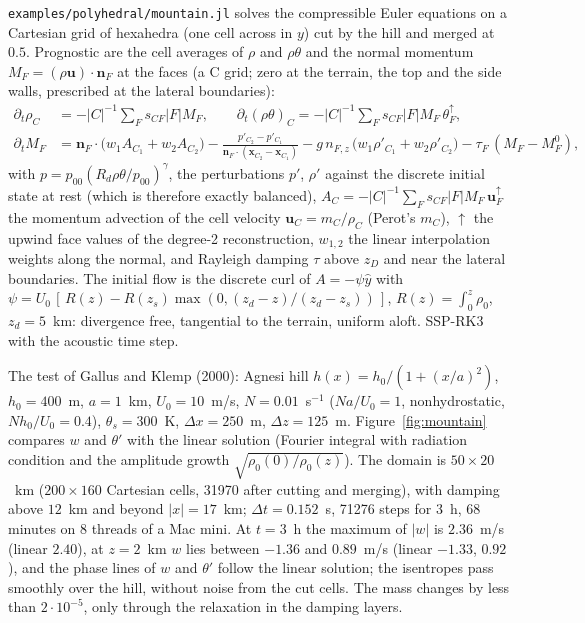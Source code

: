 \documentclass[11pt,a4paper]{article}
\newcommand{\code}[1]{\texttt{#1}}
\newcommand{\bn}{\mathbf{n}}
\newcommand{\bx}{\mathbf{x}}
\newcommand{\bu}{\mathbf{u}}
\begin{document}
\code{examples/polyhedral/mountain.jl} solves the compressible Euler equations on a Cartesian grid of
hexahedra (one cell across in $y$) cut by the hill and merged at $0.5$. Prognostic are the cell
averages of $\rho$ and $\rho\theta$ and the normal momentum $M_F = (\rho\bu)\cdot\bn_F$ at the faces
(a C grid; zero at the terrain, the top and the side walls, prescribed at the lateral boundaries):
\begin{align*}
\partial_t\rho_C &= -|C|^{-1}\textstyle\sum_F s_{CF}|F|M_F, \qquad
\partial_t(\rho\theta)_C = -|C|^{-1}\textstyle\sum_F s_{CF}|F|M_F\,\theta_F^{\uparrow},\\
\partial_t M_F &= \bn_F\cdot\big(w_1 A_{C_1} + w_2 A_{C_2}\big)
  - \frac{p'_{C_2} - p'_{C_1}}{\bn_F\cdot(\bx_{C_2} - \bx_{C_1})} - g\,n_{F,z}\,\big(w_1\rho'_{C_1} + w_2\rho'_{C_2}\big)
  - \tau_F\,(M_F - M_F^0),
\end{align*}
with $p = p_{00}(R_d\rho\theta/p_{00})^{\gamma}$, the perturbations $p'$, $\rho'$ against the
discrete initial state at rest (which is therefore exactly balanced),
$A_C = -|C|^{-1}\sum_F s_{CF}|F|M_F\,\bu_F^{\uparrow}$ the momentum advection of the cell velocity
$\bu_C = m_C/\rho_C$ (Perot's $m_C$), $\uparrow$ the upwind face values of the degree-2
reconstruction, $w_{1,2}$ the linear interpolation weights along the normal, and Rayleigh damping
$\tau$ above $z_D$ and near the lateral boundaries. The initial flow is the discrete curl of
$A = -\psi\hat y$ with $\psi = U_0\,[\,R(z) - R(z_s)\max(0, (z_d - z)/(z_d - z_s))\,]$,
$R(z) = \int_0^z \rho_0$, $z_d = 5$~km: divergence free, tangential to the terrain, uniform aloft.
SSP-RK3 with the acoustic time step.

The test of Gallus and Klemp (2000): Agnesi hill $h(x) = h_0/(1 + (x/a)^2)$, $h_0 = 400$~m,
$a = 1$~km, $U_0 = 10$~m/s, $N = 0.01$~s$^{-1}$ ($Na/U_0 = 1$, nonhydrostatic, $Nh_0/U_0 = 0.4$),
$\theta_s = 300$~K, $\Delta x = 250$~m, $\Delta z = 125$~m. Figure~\ref{fig:mountain} compares $w$ and
$\theta'$ with the linear solution (Fourier integral with radiation condition and the amplitude
growth $\sqrt{\rho_0(0)/\rho_0(z)}$).
The domain is $50 \times 20$~km ($200\times160$ Cartesian cells, 31970 after cutting and
merging), with damping above $12$~km and beyond $|x| = 17$~km; $\Delta t = 0.152$~s, 71276 steps for
3~h, 68 minutes on 8 threads of a Mac mini. At $t = 3$~h the maximum of $|w|$ is $2.36$~m/s
(linear $2.40$), at $z = 2$~km $w$ lies between $-1.36$ and $0.89$~m/s (linear $-1.33$, $0.92$), and
the phase lines of $w$ and $\theta'$ follow the linear solution; the isentropes pass smoothly over the
hill, without noise from the cut cells. The mass changes by less than $2\cdot10^{-5}$, only through the
relaxation in the damping layers.
\end{document}
